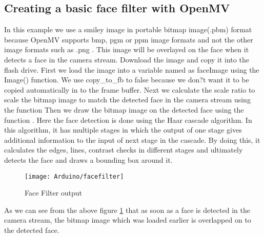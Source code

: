 \subsection{Creating a basic face filter with OpenMV}
In this example we use a smiley image in portable bitmap image(.pbm) format because OpenMV supports bmp, pgm or ppm image formats and not the other image formats such as .png \cite{Romero:2020}.  This image will be overlayed on the face when it detects a face in the camera stream. 
Download the image and copy it into the flash drive.
First we load the image into a variable named as faceImage using the Image() function. We use copy\_to\_fb to false because we don?t want it to be copied automatically in to the frame buffer. Next we calculate the scale ratio to scale the bitmap image to match the detected face in the camera stream using the function 
Then we draw the bitmap image on the detected face using the function .
Here the face detection is done using the Haar cascade algorithm. In this algorithm, it has multiple stages in which the output of one stage gives additional information  to the input of next stage in the cascade. By doing this, it calculates the edges, lines, contrast checks in different stages and ultimately detects the face and draws a bounding box around it. 


\begin{figure}[H]
	\centering
	\texttt{[image: Arduino/facefilter]}
	\caption{Face Filter output}
	\label{figure 6.10}
\end{figure}
As we can see from the above figure  \ref{figure 6.10} that as soon as a face is detected in the camera stream, the bitmap image which was loaded earlier is overlapped on to the detected face.

